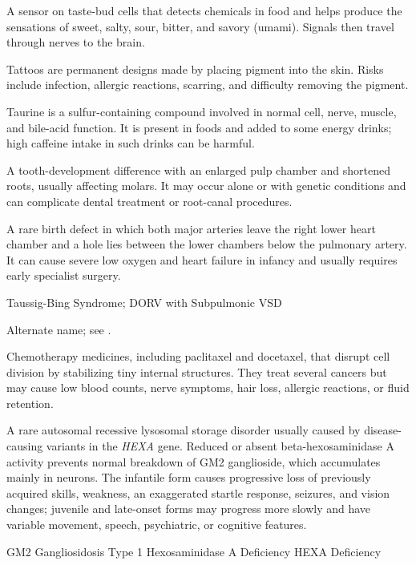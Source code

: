  A sensor on taste-bud cells that detects chemicals in food and helps produce the sensations of sweet, salty, sour, bitter, and savory (umami). Signals then travel through nerves to the brain.

 Tattoos are permanent designs made by placing pigment into the skin. Risks include infection, allergic reactions, scarring, and difficulty removing the pigment.

 Taurine is a sulfur-containing compound involved in normal cell, nerve, muscle, and bile-acid function. It is present in foods and added to some energy drinks; high caffeine intake in such drinks can be harmful.

 A tooth-development difference with an enlarged pulp chamber and shortened roots, usually affecting molars. It may occur alone or with genetic conditions and can complicate dental treatment or root-canal procedures.

 A rare birth defect in which both major arteries leave the right lower heart chamber and a hole lies between the lower chambers below the pulmonary artery. It can cause severe low oxygen and heart failure in infancy and usually requires early specialist surgery.

\synonyms
Taussig-Bing Syndrome; DORV with Subpulmonic VSD

 Alternate name; see .

 Chemotherapy medicines, including paclitaxel and docetaxel, that disrupt cell division by stabilizing tiny internal structures. They treat several cancers but may cause low blood counts, nerve symptoms, hair loss, allergic reactions, or fluid retention.

 A rare autosomal recessive lysosomal storage disorder usually caused by disease-causing variants in the \textit{HEXA} gene. Reduced or absent beta-hexosaminidase A activity prevents normal breakdown of GM2 ganglioside, which accumulates mainly in neurons. The infantile form causes progressive loss of previously acquired skills, weakness, an exaggerated startle response, seizures, and vision changes; juvenile and late-onset forms may progress more slowly and have variable movement, speech, psychiatric, or cognitive features.

\synonyms
GM2 Gangliosidosis Type 1
Hexosaminidase A Deficiency
HEXA Deficiency

